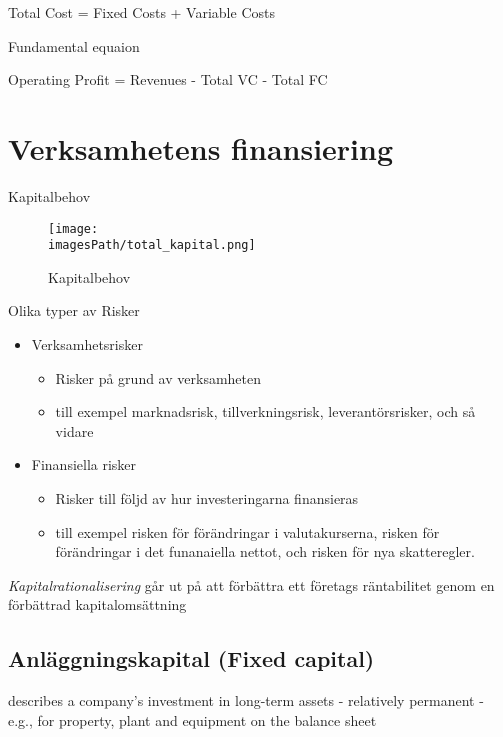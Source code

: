 \begin{center}
    Total Cost = Fixed Costs + Variable Costs
\end{center}

Fundamental equaion 
\begin{center}
    Operating Profit = Revenues - Total VC - Total FC
\end{center}

\section{Verksamhetens finansiering}
Kapitalbehov 
\begin{figure}[!h]
    \centering
    \texttt{[image: \\imagesPath/total\_kapital.png]}
    \caption{Kapitalbehov}
\end{figure}

Olika typer av Risker 
\begin{itemize}
    \item Verksamhetsrisker
    \begin{itemize}
        \item Risker på grund av verksamheten
        \item till exempel marknadsrisk, tillverkningsrisk, leverantörsrisker, och så vidare
    \end{itemize}
    \item Finansiella risker 
    \begin{itemize}
        \item Risker till följd av hur investeringarna finansieras
        \item till exempel risken för förändringar i valutakurserna, risken för förändringar i det funanaiella nettot, och risken för nya skatteregler.
    \end{itemize}
\end{itemize}

\textit{Kapitalrationalisering} går ut på att förbättra ett företags räntabilitet genom en förbättrad kapitalomsättning
\subsection{Anläggningskapital (Fixed capital)}
describes a company's investment in long-term assets - relatively permanent 
- e.g., for property, plant and equipment on the balance sheet


